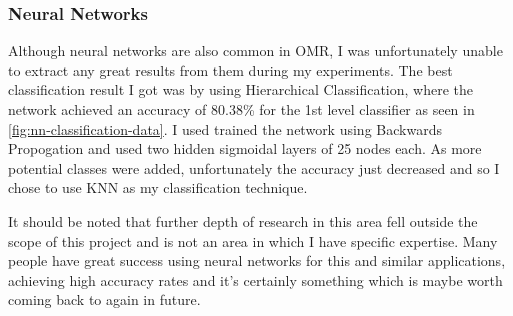 \subsubsection{Neural Networks}

Although neural networks are also common in OMR, I was unfortunately unable to extract any great results from them during my experiments. The best classification result I got was by using Hierarchical Classification, where the network achieved an accuracy of 80.38\% for the 1st level classifier as seen in \cref{fig:nn-classification-data}. I used trained the network using Backwards Propogation and used two hidden sigmoidal layers of 25 nodes each.
As more potential classes were added, unfortunately the accuracy just decreased and so I chose to use KNN as my classification technique.

It should be noted that further depth of research in this area fell outside the scope of this project and is not an area in which I have specific expertise. Many people have great success using neural networks for this and similar applications, achieving high accuracy rates and it's certainly something which is maybe worth coming back to again in future.

